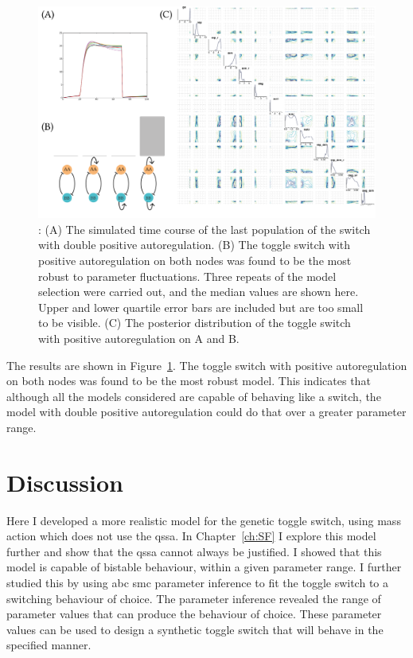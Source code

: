 \begin{figure}[htbp]
	\centerfloat
\includegraphics[scale=0.75]{../../chapters/chapterABCSysBio/images/model_sel_res-01.png}
\caption[ABC model selection resulting posterior distribution]{\label{fig:model_sel_res}: (A) The simulated time course of the last population of the switch with double positive autoregulation. (B) The toggle switch with positive autoregulation on both nodes was found to be the most robust to parameter fluctuations. Three repeats of the model selection were carried out, and the median values are shown here. Upper and lower quartile error bars are included but are too small to be visible. (C) The posterior distribution of the toggle switch with positive autoregulation on A and B.}


\end{figure}
\clearpage
The results are shown in Figure~\ref{fig:model_sel_res}. The toggle switch with positive autoregulation on both nodes was found to be the most robust model. This indicates that although all the models considered are capable of behaving like a switch, the model with double positive autoregulation could do that over a greater parameter range.  



\section{Discussion}

Here I developed a more realistic model for the genetic toggle switch, using mass action which does not use the \acrshort{qssa}. In Chapter~\ref{ch:SF} I explore this model further and show that the \acrshort{qssa} cannot always be justified. I showed that this model is capable of bistable behaviour, within a given parameter range. I further studied this by using \acrshort{abc} \acrshort{smc} parameter inference to fit the toggle switch to a switching behaviour of choice. The parameter inference revealed the range of parameter values that can produce the behaviour of choice. These parameter values can be used to design a synthetic toggle switch that will behave in the specified manner. 

